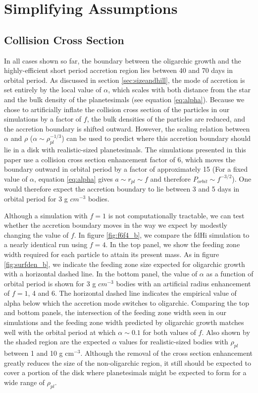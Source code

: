 \documentclass[twocolumn,linenumbers]{aastex63}
\begin{document}
\section{Simplifying Assumptions}\label{sec:assump}

\subsection{Collision Cross Section}

In all cases shown so far, the boundary between the
oligarchic growth and the highly-efficient short period accretion
region lies between 40 and 70 days in orbital period. As discussed in section \ref{sec:sizeandhill}, the mode of accretion is
set entirely by the local value of $\alpha$, which scales with both
distance from the star and the bulk density of the planetesimals (see
equation \ref{eq:alpha}). Because we chose to artificially inflate the
collision cross section of the particles in our simulations by a factor of $f$, the bulk densities
of the particles are reduced, and the accretion boundary is shifted outward.
However, the scaling relation between $\alpha$ and $\rho$ ($\alpha \sim \rho_{pl}^{-1/3}$) can be used
to predict where this accretion boundary should lie in a disk with realistic-sized planetesimals. The simulations
presented in this paper use a collision cross section enhancement factor of 6, which moves the boundary outward in orbital
period by a factor of approximately 15 (For a fixed value of $\alpha$, equation \ref{eq:alpha} gives $a \sim r_{pl} \sim f$ and therefore $P_{orbit} \sim f^{-3/2}$). One would therefore expect the accretion boundary to lie between 3 and 5 days in orbital period
for 3 g $cm^{-3}$ bodies.

Although a simulation with $f=1$ is not computationally tractable, we
can test whether the accretion boundary moves in the way we expect by
modestly changing the value of $f$. In figure \ref{fig:f6f4_b}, we
compare the fdHi simulation to a nearly identical run using $f=4$. In
the top panel, we show the feeding zone width required for each particle to
attain its present mass. As in figure \ref{fig:surfden_b}, we indicate the feeding
zone size expected for oligarchic growth with a horizontal dashed line. In the bottom panel, the value
of $\alpha$ as a function of orbital period is shown for 3 g $cm^{-3}$
bodies with an artificial radius enhancement of $f=1$, 4 and 6. The
horizontal dashed line indicates the empirical value of alpha below which the
accretion mode switches to oligarchic. Comparing the top and
bottom panels, the intersection of the feeding zone width seen in our simulations and the
feeding zone width predicted by oligarchic growth matches well with the orbital period at which $\alpha
\sim 0.1$ for both values of $f$.  Also shown by the shaded region are the expected $\alpha$ values for
realistic-sized bodies with $\rho_{pl}$ between 1 and 10 g cm$^{-3}$. Although the removal of the cross section
enhancement greatly reduces the size of the non-oligarchic region, it still should be expected to cover a portion of the
disk where planetesimals might be expected to form \citep{mulders18} for a wide range of $\rho_{pl}$.
\end{document}
